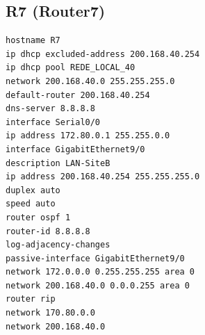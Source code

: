 \subsection*{R7 (Router7)}
\begin{lstlisting}
hostname R7
ip dhcp excluded-address 200.168.40.254
ip dhcp pool REDE_LOCAL_40
network 200.168.40.0 255.255.255.0
default-router 200.168.40.254
dns-server 8.8.8.8
interface Serial0/0
ip address 172.80.0.1 255.255.0.0
interface GigabitEthernet9/0
description LAN-SiteB
ip address 200.168.40.254 255.255.255.0
duplex auto
speed auto
router ospf 1
router-id 8.8.8.8
log-adjacency-changes
passive-interface GigabitEthernet9/0
network 172.0.0.0 0.255.255.255 area 0
network 200.168.40.0 0.0.0.255 area 0
router rip
network 170.80.0.0
network 200.168.40.0
\end{lstlisting}
